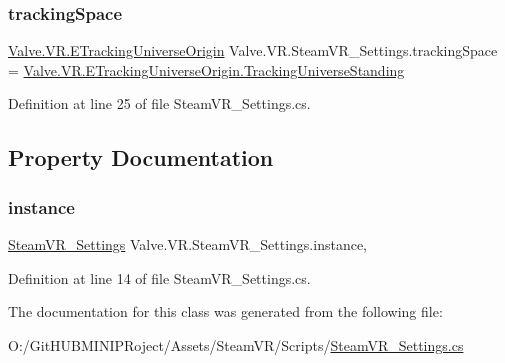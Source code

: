 \mbox{\label{class_valve_1_1_v_r_1_1_steam_v_r___settings_a915da3507ad2861be45ad3d957cece37}} 
\subsubsection{\texorpdfstring{trackingSpace}{trackingSpace}}
{\footnotesize\ttfamily \mbox{\hyperlink{namespace_valve_1_1_v_r_a29be99a3c2f780157bd490db06a7f12f}{Valve.\+V\+R.\+E\+Tracking\+Universe\+Origin}} Valve.\+V\+R.\+Steam\+V\+R\+\_\+\+Settings.\+tracking\+Space = \mbox{\hyperlink{namespace_valve_1_1_v_r_a29be99a3c2f780157bd490db06a7f12fa1feb85821c36bd21cde62a6527646367}{Valve.\+V\+R.\+E\+Tracking\+Universe\+Origin.\+Tracking\+Universe\+Standing}}}



Definition at line 25 of file Steam\+V\+R\+\_\+\+Settings.\+cs.



\subsection{Property Documentation}
\mbox{\label{class_valve_1_1_v_r_1_1_steam_v_r___settings_aba985fd967a79dc71cfc9078103f68b4}} 
\subsubsection{\texorpdfstring{instance}{instance}}
{\footnotesize\ttfamily \mbox{\hyperlink{class_valve_1_1_v_r_1_1_steam_v_r___settings}{Steam\+V\+R\+\_\+\+Settings}} Valve.\+V\+R.\+Steam\+V\+R\+\_\+\+Settings.\+instance\hspace{0.3cm}{\ttfamily [static]}, {\ttfamily [get]}}



Definition at line 14 of file Steam\+V\+R\+\_\+\+Settings.\+cs.



The documentation for this class was generated from the following file\+:\begin{DoxyCompactItemize}
\item 
O\+:/\+Git\+H\+U\+B\+M\+I\+N\+I\+P\+Roject/\+Assets/\+Steam\+V\+R/\+Scripts/\mbox{\hyperlink{_scripts_2_steam_v_r___settings_8cs}{Steam\+V\+R\+\_\+\+Settings.\+cs}}\end{DoxyCompactItemize}
